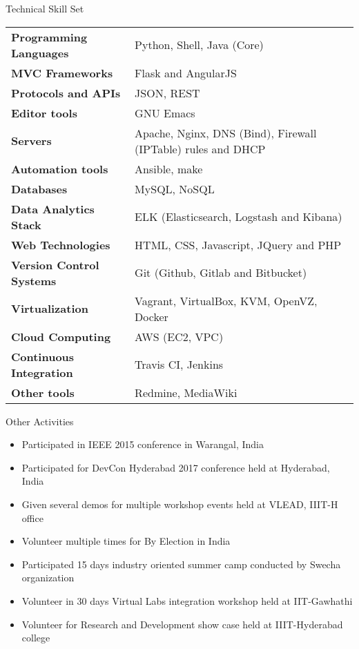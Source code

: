 \documentclass{resume} %
\begin{document}

\begin{rSection}
  {Technical Skill Set}

  \begin{tabular}{ @{} >{\bfseries}l @{\hspace{6ex}} l }
    Programming Languages & Python, Shell, Java (Core)
    \\ MVC Frameworks & Flask and AngularJS\\ Protocols and
    APIs & JSON, REST \\ Editor tools & GNU Emacs \\ Servers
    & Apache, Nginx, DNS (Bind), Firewall (IPTable) rules
    and DHCP \\ Automation tools & Ansible, make
    \\ Databases & MySQL, NoSQL \\ Data Analytics Stack &
    ELK (Elasticsearch, Logstash and Kibana) \\ Web
    Technologies & HTML, CSS, Javascript, JQuery and PHP
    \\ Version Control Systems & Git (Github, Gitlab and
    Bitbucket) \\ Virtualization & Vagrant, VirtualBox, KVM,
    OpenVZ, Docker \\ Cloud Computing & AWS (EC2, VPC)
    \\ Continuous Integration & Travis CI, Jenkins \\ Other
    tools & Redmine, MediaWiki
    
  \end{tabular}

\end{rSection}

\begin{rSection}{Other Activities}
\begin{itemize}
\item Participated in IEEE 2015 conference in Warangal, India
\item Participated for DevCon Hyderabad 2017 conference held
  at Hyderabad, India
\item Given several demos for multiple workshop events held
  at VLEAD, IIIT-H office
\item Volunteer multiple times for By Election in India
\item Participated 15 days industry oriented summer camp
  conducted by Swecha organization
\item Volunteer in 30 days Virtual Labs integration workshop
  held at IIT-Gawhathi
\item Volunteer for Research and Development show case held
  at IIIT-Hyderabad college
 
\end{itemize}
\end{rSection}
\end{document}
